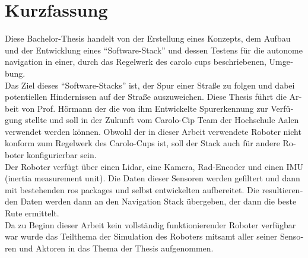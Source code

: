 \chapter*{Kurzfassung}
\label{kurzfassung}

\begin{otherlanguage}{ngerman}

Diese Bachelor-Thesis handelt von der Erstellung eines Konzepts, dem Aufbau und der Entwicklung eines ``Software-Stack'' und dessen Testens für die autonome navigation in einer, durch das Regelwerk des carolo cups beschriebenen, Umgebung.\\

Das Ziel dieses ``Software-Stacks'' ist, der Spur einer Straße zu folgen und dabei potentiellen Hindernissen auf der Straße auszuweichen. Diese Thesis führt die Arbeit von Prof. Hörmann der die von ihm Entwickelte Spurerkennung zur Verfügung stellte und soll in der Zukunft vom Carolo-Cip Team der Hochschule Aalen verwendet werden können. Obwohl der in dieser Arbeit verwendete Roboter nicht konform zum Regelwerk des Carolo-Cups ist, soll der Stack auch für andere Roboter konfigurierbar sein.\\

Der Roboter verfügt über einen Lidar, eine Kamera, Rad-Encoder und einen IMU (inertia measurement unit). Die Daten dieser Sensoren werden gefiltert und dann mit bestehenden ros packages und selbst entwickelten aufbereitet. Die resultierenden Daten werden dann an den Navigation Stack  übergeben, der dann die beste Rute ermittelt.\\

Da zu Beginn dieser Arbeit kein vollständig funktionierender Roboter verfügbar war wurde das Teilthema der Simulation des Roboters mitsamt aller seiner Sensoren und Aktoren in das Thema der Thesis aufgenommen.

\end{otherlanguage}
